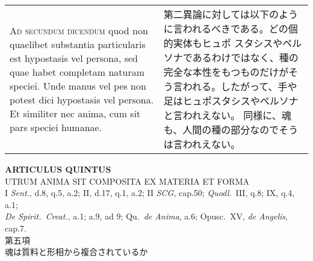 \documentclass[paper=a4paper,fontsize=10pt,jafontsize=9pt,titlepage]{jlreq}
\begin{document}
\begin{longtable}{p{21em}p{21em}}
\\




{\scshape Ad secundum dicendum} quod non quaelibet substantia
particularis est hypostasis vel persona, sed quae habet completam
naturam speciei. Unde manus vel pes non potest dici hypostasis vel
persona. Et similiter nec anima, cum sit pars speciei humanae.


&

第二異論に対しては以下のように言われるべきである。どの個的実体もヒュポ
スタシスやペルソナであるわけではなく、種の完全な本性をもつものだけがそ
う言われる。したがって、手や足はヒュポスタシスやペルソナと言われえない。
同様に、魂も、人間の種の部分なのでそうは言われえない。




\end{longtable}
\newpage





\begin{center}
{\Large {\bfseries ARTICULUS QUINTUS}}\\
{\large UTRUM ANIMA SIT COMPOSITA EX MATERIA ET FORMA}\\
{\footnotesize I {\itshape Sent.}, d.8, q.5, a.2; II, d.17, q.1, a.2; II {\itshape SCG}, cap.50; {\itshape Quodl}.~III, q.8; IX, q.4, a.1;\\ {\itshape De Spirit.~Creat.}, a.1; a.9, ad 9; Qu.~{\itshape de Anima}, a.6; Opusc.~XV, {\itshape de Angelis}, cap.7.}\\
{\Large 第五項\\魂は質料と形相から複合されているか}
\end{center}
\end{document}
